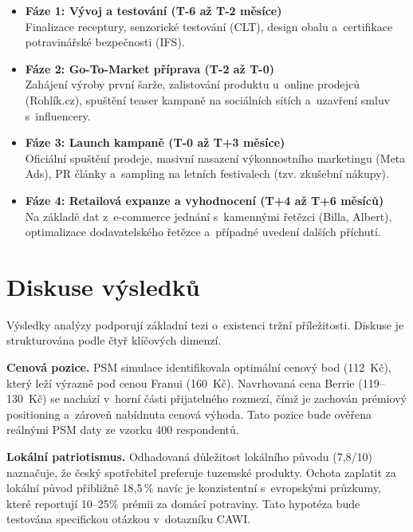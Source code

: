 \begin{itemize}
  \item \textbf{Fáze 1: Vývoj a testování (T-6 až T-2 měsíce)} \\
  Finalizace receptury, senzorické testování (CLT), design obalu a~certifikace potravinářské bezpečnosti (IFS).
  \item \textbf{Fáze 2: Go-To-Market příprava (T-2 až T-0)} \\
  Zahájení výroby první šarže, zalistování produktu u~online prodejců (Rohlík.cz), spuštění teaser kampaně na sociálních sítích a~uzavření smluv s~influencery.
  \item \textbf{Fáze 3: Launch kampaně (T-0 až T+3 měsíce)} \\
  Oficiální spuštění prodeje, masivní nasazení výkonnostního marketingu (Meta Ads), PR články a~sampling na letních festivalech (tzv. zkušební nákupy).
  \item \textbf{Fáze 4: Retailová expanze a vyhodnocení (T+4 až T+6 měsíců)} \\
  Na základě dat z~e-commerce jednání s~kamennými řetězci (Billa, Albert), optimalizace dodavatelského řetězce a~případné uvedení dalších příchutí.
\end{itemize}

\section{Diskuse výsledků}
\label{sec:res_discussion}

Výsledky analýzy podporují základní tezi o~existenci tržní příležitosti. Diskuse je strukturována podle čtyř klíčových dimenzí.

\textbf{Cenová pozice.} PSM simulace identifikovala optimální cenový bod (112~Kč), který leží výrazně pod cenou Franui (160~Kč). Navrhovaná cena Berrie (119--130~Kč) se nachází v~horní části přijatelného rozmezí, čímž je zachován prémiový positioning a~zároveň nabídnuta cenová výhoda. Tato pozice bude ověřena reálnými PSM daty ze vzorku 400 respondentů.

\textbf{Lokální patriotismus.} Odhadovaná důležitost lokálního původu (7,8/10) naznačuje, že český spotřebitel preferuje tuzemské produkty. Ochota zaplatit za lokální původ přibližně 18,5\,\% navíc je konzistentní s~evropskými průzkumy, které reportují 10--25\% prémii za domácí potraviny. Tato hypotéza bude testována specifickou otázkou v~dotazníku CAWI.

